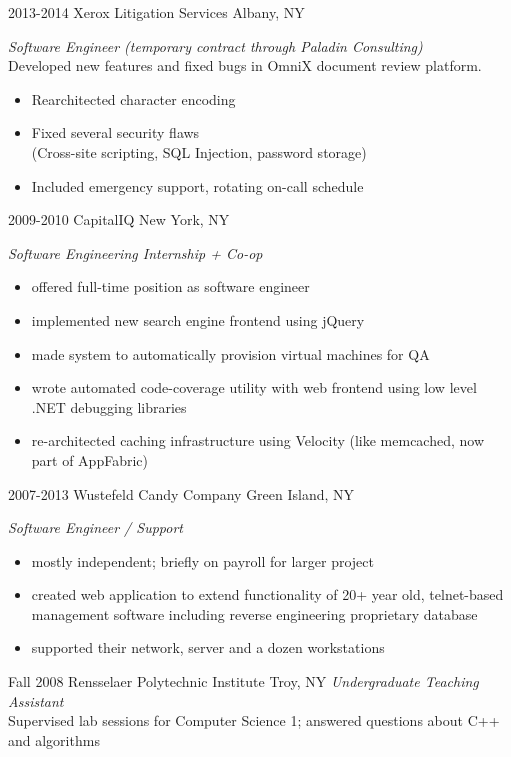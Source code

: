 \documentclass[]{friggeri-cv} %
\begin{document}
\begin{entrylist}


\entry
{2013-2014}
{Xerox Litigation Services}
{Albany, NY}
{\emph{Software Engineer (temporary contract through Paladin Consulting)} \\
Developed new features and fixed bugs in OmniX document review platform.
\begin{itemize}
\item Rearchitected character encoding
\item Fixed several security flaws \\
(Cross-site scripting, SQL Injection, password storage)
\item Included emergency support, rotating on-call schedule
\end{itemize}
}

\entry
{2009-2010}
{CapitalIQ}
{New York, NY}
{
\emph{Software Engineering Internship + Co-op}
\begin{itemize}
\item offered full-time position as software engineer
\item implemented new search engine frontend using jQuery
\item made system to automatically provision virtual machines for QA
\item wrote automated code-coverage utility with web frontend using low level .NET debugging libraries
\item re-architected caching infrastructure using Velocity (like memcached, now part of AppFabric)
\end{itemize}
}

\entry
{2007-2013}
{Wustefeld Candy Company}
{Green Island, NY}
{
\emph{Software Engineer / Support}
\begin{itemize}
\item mostly independent; briefly on payroll for larger project
\item created web application to extend functionality of 20+ year old, telnet-based management software including reverse engineering proprietary database
\item supported their network, server and a dozen workstations
\end{itemize}
}


\entry
{Fall 2008}
{Rensselaer Polytechnic Institute}
{Troy, NY}
{
\emph{Undergraduate Teaching Assistant} \\
Supervised lab sessions for Computer Science 1; answered questions about C++ and algorithms
}

\end{entrylist}
\end{document}

